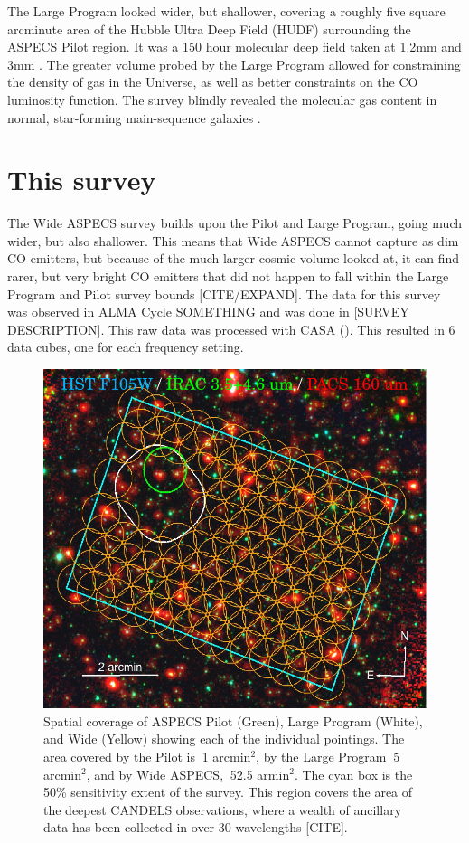 The Large Program looked wider, but shallower, covering a roughly five square arcminute area of the Hubble Ultra Deep Field (HUDF) surrounding the ASPECS Pilot region. It was a 150 hour molecular deep field taken at 1.2mm and 3mm \cite{decarli2019alma}.  The greater volume probed by the Large Program allowed for constraining the density of gas in the Universe, as well as better constraints on the CO luminosity function. The survey blindly revealed the molecular gas content in normal, star-forming main-sequence galaxies \cite{decarli2019alma}. 

\section{This survey}


The Wide ASPECS survey builds upon the Pilot and Large Program, going much wider, but also shallower. This means that Wide ASPECS cannot capture as dim CO emitters, but because of the much larger cosmic volume looked at, it can find rarer, but very bright CO emitters that did not happen to fall within the Large Program and Pilot survey bounds [CITE/EXPAND]. 
The data for this survey was observed in ALMA Cycle SOMETHING and was done in [SURVEY DESCRIPTION]. This raw data was processed with CASA (). This resulted in 6 data cubes, one for each frequency setting. 

\begin{figure}[tbp]
\centering \includegraphics[width=120mm]{Wide_ASPECS_Coverage.png}
\caption{Spatial coverage of ASPECS Pilot (Green), Large Program (White), and Wide (Yellow) showing each of the individual pointings. The area covered by the Pilot is $~$1 arcmin$^2$, by the Large Program $~$5 arcmin$^2$, and by Wide ASPECS, $~$52.5 armin$^2$. The cyan box is the 50\% sensitivity extent of the survey. This region covers the area of the deepest CANDELS observations, where a wealth of ancillary data has been collected in over 30 wavelengths [CITE].}
\label{fig:ASPECS_Coverage}
\end{figure}

